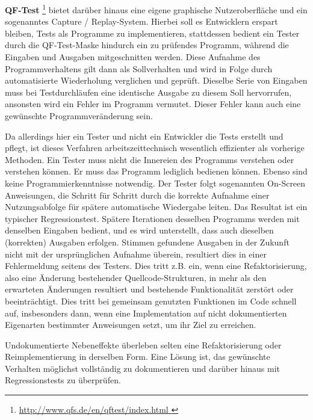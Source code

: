 \vspace{0.5cm}

\textbf{QF-Test} \footnote{\url{ http://www.qfs.de/en/qftest/index.html }} 
bietet darüber hinaus eine eigene graphische Nutzeroberfläche
und ein sogenanntes \glqq{}Capture / Replay\grqq{}-System. Hierbei soll es Entwicklern erspart bleiben,
Tests als Programme zu implementieren, stattdessen bedient ein Tester durch die QF-Test-Maske
hindurch ein zu prüfendes Programm, während die Eingaben und Ausgaben mitgeschnitten werden.
Diese Aufnahme des Programmverhaltens gilt dann als \glqq{}Sollverhalten\grqq{} und wird in Folge
durch automatisierte Wiederholung verglichen und geprüft. Dieselbe Serie von Eingaben muss
bei Testdurchläufen eine identische Ausgabe zu diesem Soll hervorrufen, ansonsten
wird ein Fehler im Programm vermutet. Dieser Fehler kann auch eine gewünschte Programmveränderung sein.

Da allerdings hier ein Tester und nicht ein Entwickler die Tests erstellt und pflegt, ist dieses
Verfahren arbeitszeittechnisch wesentlich effizienter als vorherige Methoden. Ein Tester muss
nicht die Innereien des Programms verstehen oder verstehen können. Er muss das Programm lediglich
bedienen können. Ebenso sind keine Programmierkenntnisse notwendig. Der Tester folgt sogenannten
\glqq{}On-Screen\grqq{} Anweisungen, die Schritt für Schritt durch die korrekte Aufnahme einer
Nutzungsabfolge für spätere automatische Wiedergabe leiten. Das Resultat ist ein typischer
Regressionstest. Spätere Iterationen desselben Programms werden mit denselben Eingaben
bedient, und es wird unterstellt, dass auch dieselben (korrekten) Ausgaben erfolgen.
Stimmen gefundene Ausgaben in der Zukunft nicht mit der ursprünglichen Aufnahme überein, resultiert
dies in einer Fehlermeldung seitens des Testers. Dies tritt z.B. ein, wenn eine Refaktorisierung,
also eine Änderung bestehender Quellcode-Strukturen, in mehr als den erwarteten Änderungen
resultiert und bestehende Funktionalität zerstört oder beeinträchtigt. Dies tritt bei
gemeinsam genutzten Funktionen im Code schnell auf, insbesonders dann, wenn eine Implementation 
auf nicht dokumentierten Eigenarten bestimmter Anweisungen setzt, um ihr Ziel zu erreichen.

Undokumentierte Nebeneffekte überleben selten eine Refaktorisierung oder Reimplementierung
in derselben Form. Eine Lösung ist, das gewünschte Verhalten möglichst vollständig zu dokumentieren
und darüber hinaus mit Regressionstests zu überprüfen.


\vspace{0.5cm}

